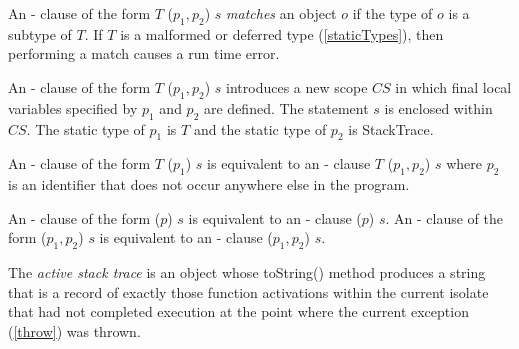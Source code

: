 \documentclass{article}
\newcommand{\code}[1]{{\sf #1}}
\begin{document}

\LMHash{}
An \ON{}-\CATCH{} clause of the form   \code{\ON{} $T$ \CATCH{} ($p_1, p_2$) $s$}  {\em matches} an object $o$  if the type of $o$ is a subtype of $T$.  If $T$ is a malformed or deferred type  (\ref{staticTypes}), then performing a match causes a run time error.


\LMHash{}
An \ON{}-\CATCH{} clause of the form   \code{\ON{} $T$ \CATCH{} ($p_1, p_2$) $s$} introduces a new scope $CS$ in which final local variables specified by $p_1$ and $p_2$ are defined. The statement $s$ is enclosed within $CS$. The static type of $p_1$ is $T$ and the static type of $p_2$ is \code{StackTrace}.


\LMHash{}
An \ON{}-\CATCH{} clause of the form  \code{\ON{} $T$ \CATCH{} ($p_1$) $s$} is equivalent to an \ON{}-\CATCH{} clause  \code{\ON{} $T$ \CATCH{} ($p_1, p_2$) $s$} where $p_2$ is an identifier that does not occur anywhere else in the program. 


\LMHash{}
An \ON{}-\CATCH{} clause of the form  \code{\CATCH{} ($p$) $s$} is equivalent to an \ON{}-\CATCH{} clause  \code{\ON{} \DYNAMIC{} \CATCH{} ($p$) $s$}. An \ON{}-\CATCH{} clause of the form  \code{\CATCH{} ($p_1, p_2$) $s$} is equivalent to an \ON{}-\CATCH{} clause  \code{\ON{} \DYNAMIC{} \CATCH{} ($p_1, p_2$) $s$}.



\LMHash{}
The {\em active stack trace} is an object whose \code{toString()} method produces a string that is a record of exactly those function activations within the current isolate that had not completed execution at the point where the current exception (\ref{throw}) was thrown.
\end{document}
